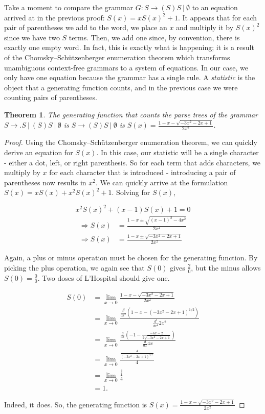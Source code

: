\documentclass[11pt]{amsart}
\theoremstyle{plain}%
\newtheorem{thm}{Theorem}[section]
\theoremstyle{definition}
\theoremstyle{remark}
\numberwithin{equation}{thm}
\begin{document}
Take a moment to compare the grammar $G: S \rightarrow (S)S\ |\ \emptyset$ to an equation arrived at in the previous proof: $S(x) = xS(x)^2 + 1$. It appears that for each pair of parentheses we add to the word, we place an $x$ and multiply it by $S(x)^2$ since we have two $S$ terms. Then, we add one since, by convention, there is exactly one empty word. In fact, this is exactly what is happening; it is a result of the Chomsky–Schützenberger enumeration theorem which transforms unambiguous context-free grammars to a system of equations. In our case, we only have one equation because the grammar has a single rule. A \textit{statistic} is the object that a generating function counts, and in the previous case we were counting pairs of parentheses.

\begin{thm}
    The generating function that counts the parse trees of the grammar $S \rightarrow .S\ |\ (S)S\ |\ \emptyset$ is $S \rightarrow (S)S\ |\ \emptyset$ is $S(x) = \frac{1-x - \sqrt{-3x^2 - 2x + 1}}{2x^2}$.
\end{thm}

\begin{proof}
    Using the Chomsky–Schützenberger enumeration theorem, we can quickly derive an equation for $S(x)$. In this case, our statistic will be a single character - either a dot, left, or right parenthesis. So for each term that adds characters, we multiply by $x$ for each character that is introduced - introducing a pair of parentheses now results in $x^2$. We can quickly arrive at the formulation $S(x) = xS(x) + x^2S(x)^2  + 1$. Solving for $S(x)$,


    $$x^2S(x)^2 + (x-1)S(x) + 1 = 0$$
    \begin{align*}
    \Rightarrow S(x) &= \frac{1-x \pm \sqrt{(x-1)^2 - 4x^2}}{2x^2}\\
    \Rightarrow S(x) &= \frac{1-x \pm \sqrt{-3x^2 - 2x + 1}}{2x^2}
    \end{align*}
    
    Again, a plus or minus operation must be chosen for the generating function. By picking the plus operation, we again see that $S(0)$ gives $\frac{2}{0}$, but the minus allows $S(0) = \frac{0}{0}$. Two doses of L'Hospital should give one.

    \begin{align*}
        S(0) &= \lim_{x\to0}\frac{1-x - \sqrt{-3x^2 - 2x + 1}}{2x^2}\\
        &= \lim_{x\to0}\frac{\frac{d^2}{dx^2} \left(1-x - (-3x^2 - 2x + 1)^{1/2}\right)}{\frac{d^2}{dx^2}2x^2}\\
        &= \lim_{x\to0}\frac{\frac{d}{dx}\left(-1-\frac{-6x-2}{2\sqrt{-3x^2-2x+1}}\right)}{\frac{d}{dx}4x}\\
        &= \lim_{x\to0}\frac{\frac{4}{(-3x^2-2x+1)^{3/2}}}{4}\\
        &= \lim_{x\to0}\frac{\frac{4}{1}}{4}\\
        &= 1.
    \end{align*}
    
    Indeed, it does. So, the generating function is $S(x) = \frac{1-x - \sqrt{-3x^2 - 2x + 1}}{2x^2}$
\end{proof}
\end{document}
